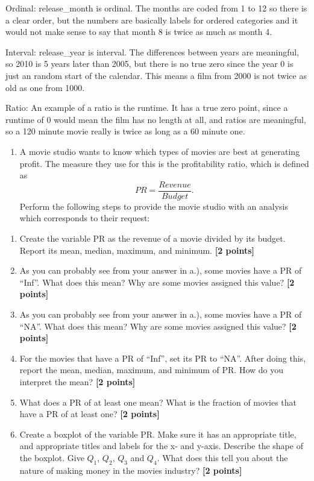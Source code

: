 \documentclass[
]{article}
\providecommand{\tightlist}{%
  \setlength{\itemsep}{0pt}\setlength{\parskip}{0pt}}
\begin{document}
Ordinal: release\_month is ordinal. The months are coded from 1 to 12 so
there is a clear order, but the numbers are basically labels for ordered
categories and it would not make sense to say that month 8 is twice as
much as month 4.

Interval: release\_year is interval. The differences between years are
meaningful, so 2010 is 5 years later than 2005, but there is no true
zero since the year 0 is just an random start of the calendar. This
means a film from 2000 is not twice as old as one from 1000.

Ratio: An example of a ratio is the runtime. It has a true zero point,
since a runtime of 0 would mean the film has no length at all, and
ratios are meaningful, so a 120 minute movie really is twice as long as
a 60 minute one.

\begin{enumerate}
\def\labelenumi{\arabic{enumi}.}
\setcounter{enumi}{2}
\tightlist
\item
  A movie studio wants to know which types of movies are best at
  generating profit. The measure they use for this is the profitability
  ratio, which is defined as \[PR=\frac{Revenue}{Budget}.\] Perform the
  following steps to provide the movie studio with an analysis which
  corresponds to their request:
\end{enumerate}

\begin{enumerate}
\def\labelenumi{\alph{enumi}.}
\tightlist
\item
  Create the variable PR as the revenue of a movie divided by its
  budget. Report its mean, median, maximum, and minimum.
  \textbf{[2 points]}
\item
  As you can probably see from your answer in a.), some movies have a PR
  of ``Inf''. What does this mean? Why are some movies assigned this
  value? \textbf{[2 points]}
\item
  As you can probably see from your answer in a.), some movies have a PR
  of ``NA''. What does this mean? Why are some movies assigned this
  value? \textbf{[2 points]}
\item
  For the movies that have a PR of ``Inf'', set its PR to ``NA''. After
  doing this, report the mean, median, maximum, and minimum of PR. How
  do you interpret the mean? \textbf{[2 points]}
\item
  What does a PR of at least one mean? What is the fraction of movies
  that have a PR of at least one? \textbf{[2 points]}
\item
  Create a boxplot of the variable PR. Make sure it has an appropriate
  title, and appropriate titles and labels for the x- and y-axis.
  Describe the shape of the boxplot. Give \(Q_1\), \(Q_2\), \(Q_3\) and
  \(Q_4\). What does this tell you about the nature of making money in
  the movies industry? \textbf{[2 points]}
\end{enumerate}
\end{document}
